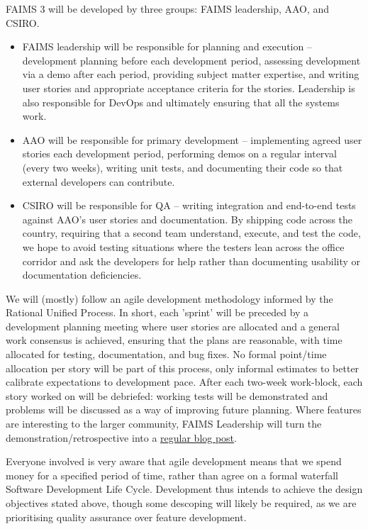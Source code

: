\documentclass[a4paper,headings=small fontsize=10pt]{scrreprt}
\begin{document}
FAIMS 3 will be developed by three groups: FAIMS leadership, AAO, and
CSIRO.

\begin{itemize}
\item FAIMS leadership will be responsible for planning and execution --
  development planning before each development period, assessing
  development via a demo after each period, providing subject matter
  expertise, and writing user stories and appropriate acceptance
  criteria for the stories. Leadership is also responsible for DevOps
  and ultimately ensuring that all the systems work.
 
\item AAO will be responsible for primary development -- implementing
  agreed user stories each development period, performing demos on a
  regular interval (every two weeks), writing unit tests, and
  documenting their code so that external developers can contribute.
 
\item CSIRO will be responsible for QA -- writing integration and
  end-to-end tests against AAO's user stories and documentation. By
  shipping code across the country, requiring that a second team
  understand, execute, and test the code, we hope to avoid testing
  situations where the testers lean across the office corridor and ask
  the developers for help rather than documenting usability or
  documentation deficiencies.
 
\end{itemize}

We will (mostly) follow an agile development methodology informed by the
Rational Unified Process. In short, each 'sprint' will be preceded by a
development planning meeting where user stories are allocated and a
general work consensus is achieved, ensuring that the plans are
reasonable, with time allocated for testing, documentation, and bug
fixes. No formal point/time allocation per story will be part of this
process, only informal estimates to better calibrate expectations to
development pace. After each two-week work-block, each story worked on
will be debriefed: working tests will be demonstrated and problems will
be discussed as a way of improving future planning. Where features are
interesting to the larger community, FAIMS Leadership will turn the
demonstration/retrospective into a
\href{https://factorio.com/blog/}{{regular blog post}}.

Everyone involved is very aware that agile development means that we
spend money for a specified period of time, rather than agree on a
formal waterfall Software Development Life Cycle. Development thus
intends to achieve the design objectives stated above, though some
descoping will likely be required, as we are prioritising quality
assurance over feature development.
\end{document}
